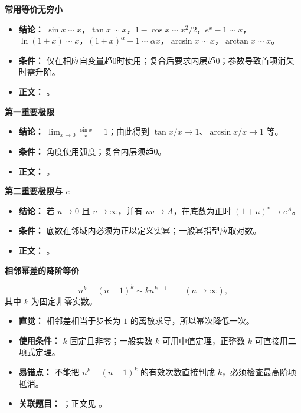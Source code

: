 \begin{knowledgeBox}
\textbf{常用等价无穷小}

\begin{itemize}
  \item \textbf{结论：} $\sin x\sim x$，$\tan x\sim x$，$1-\cos x\sim x^2/2$，$e^x-1\sim x$，$\ln(1+x)\sim x$，$(1+x)^\alpha-1\sim\alpha x$，$\arcsin x\sim x$，$\arctan x\sim x$。
  \item \textbf{条件：} 仅在相应自变量趋0时使用；复合后要求内层趋0；参数导致首项消失时需升阶。
  \item \textbf{正文：} 。
\end{itemize}

\textbf{第一重要极限}

\begin{itemize}
  \item \textbf{结论：} $\lim_{x\to0}\frac{\sin x}{x}=1$；由此得到 $\tan x/x\to1$、$\arcsin x/x\to1$ 等。
  \item \textbf{条件：} 角度使用弧度；复合内层须趋0。
  \item \textbf{正文：} 。
\end{itemize}

\textbf{第二重要极限与 $e$}

\begin{itemize}
  \item \textbf{结论：} 若 $u\to0$ 且 $v\to\infty$，并有 $uv\to A$，在底数为正时 $(1+u)^v\to e^A$。
  \item \textbf{条件：} 底数在邻域内必须为正以定义实幂；一般幂指型应取对数。
  \item \textbf{正文：} 。
\end{itemize}

\end{knowledgeBox}

\begin{knowledgeBox}
\textbf{相邻幂差的降阶等价}

\[
n^k-(n-1)^k\sim k n^{k-1}\qquad(n\to\infty),
\]
其中 $k$ 为固定非零实数。

\begin{itemize}
  \item \textbf{直觉：} 相邻差相当于步长为 $1$ 的离散求导，所以幂次降低一次。
  \item \textbf{使用条件：} $k$ 固定且非零；一般实数 $k$ 可用中值定理，正整数 $k$ 可直接用二项式定理。
  \item \textbf{易错点：} 不能把 $n^k-(n-1)^k$ 的有效次数直接判成 $k$，必须检查最高阶项抵消。
  \item \textbf{关联题目：} ；正文见 。
\end{itemize}
\end{knowledgeBox}

